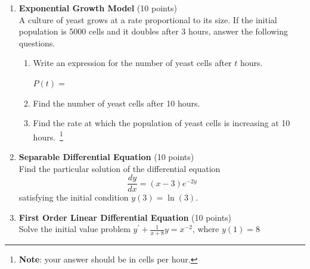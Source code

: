 \begin{enumerate}
  \item \textbf{Exponential Growth Model} (10 points)\\
  A culture of yeast grows at a rate proportional to its size. If the initial population is 5000 cells and it doubles after 3 hours, answer the following questions.
  \begin{enumerate}[label=\arabic*.]
    \item Write an expression for the number of yeast cells after $t$ hours.\\
    \begin{subanswer}
      $P(t)=$
    \end{subanswer}
    \item Find the number of yeast cells after 10 hours.\\
    \begin{subanswer}
    \end{subanswer}
    \item Find the rate at which the population of yeast cells is increasing at 
    10 hours.~\footnote{\textbf{Note}: your answer should be in cells per hour.}\\
    \begin{subanswer}
    \end{subanswer}
  \end{enumerate}

  \item \textbf{Separable Differential Equation} (10 points)\\
  Find the particular solution of the differential equation
  $$
  \frac{d y}{d x}=(x-3) e^{-2 y}
  $$
  satisfying the initial condition $y(3)=\ln (3)$.
  \begin{subanswer}
  \end{subanswer}

  \newpage

  \item \textbf{First Order Linear Differential Equation} (10 points)\\
  Solve the initial value problem $y^{\prime}+\frac{1}{x+8} y=x^{-2}$, where $y(1)=8$
  \begin{subanswer}
  \end{subanswer}


\end{enumerate}
